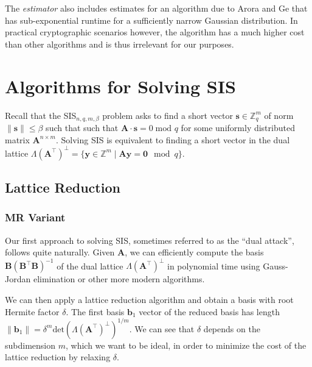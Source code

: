 The \textit{estimator} also includes estimates for an algorithm due to Arora and Ge \cite{AG11} that has sub-exponential runtime for a sufficiently narrow Gaussian distribution. In practical cryptographic scenarios however, the algorithm has a much higher cost than other algorithms and is thus irrelevant for our purposes.


\section{Algorithms for Solving SIS}
Recall that the SIS$_{n, q, m, \beta}$ problem asks to find a short vector $\mathbf{s} \in \mathbb{Z}_q^m$ of norm $\|\mathbf{s}\| \leq \beta$ such that such that $\mathbf{A} \cdot \mathbf{s} = 0 \; \text{mod } q$ for some uniformly distributed matrix $\mathbf{A}^{n\times m}$. Solving SIS is equivalent to finding a short vector in the dual lattice $\Lambda(\mathbf{A}^\intercal)^{\perp} = \{ \mathbf{y} \in \mathbb{Z}^m \mid \mathbf{A} \mathbf{y} = \mathbf{0} \mod q\}$.


\subsection{Lattice Reduction}\label{sec:dual-attack}
\subsubsection{MR Variant \cite{MR09}} \label{sec:mr-variant}
Our first approach to solving SIS, sometimes referred to as the ``dual attack'', follows quite naturally. Given $\mathbf{A}$, we can efficiently compute the basis $\mathbf{B} (\mathbf{B}^\intercal \mathbf{B})^{-1}$ of the dual lattice $\Lambda(\mathbf{A}^\intercal)^{\perp}$ in polynomial time using Gauss-Jordan elimination or other more modern algorithms.

We can then apply a lattice reduction algorithm and obtain a basis with root Hermite factor $\delta$. The first basis $\mathbf{b}_1$ vector of the reduced basis has length $\|\mathbf{b}_1\| = \delta^m \text{det}(\Lambda(\mathbf{A}^\intercal)^{\perp})^{1/m}$. We can see that $\delta$ depends on the subdimension $m$, which we want to be ideal, in order to minimize the cost of the lattice reduction by relaxing $\delta$.

